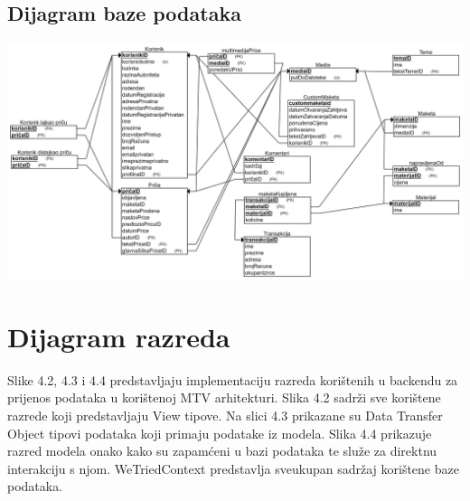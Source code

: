 			
			
			
			\subsection{Dijagram baze podataka}
			\vspace{\baselineskip}
			\vspace{\baselineskip}
			\vspace{\baselineskip}
			\vspace{\baselineskip}
			\vspace{\baselineskip}
			\vspace{\baselineskip}
			\vspace{\baselineskip}
			\vspace{\baselineskip}
			\vspace{\baselineskip}
			\vspace{\baselineskip}
				\includegraphics[width=1\linewidth]{slike/bazaRelShem}
			
			\eject
			
			
		\section{Dijagram razreda}
		
		Slike 4.2, 4.3 i 4.4 predstavljaju implementaciju razreda korištenih u backendu za prijenos podataka u korištenoj MTV arhitekturi. Slika 4.2 sadrži sve korištene razrede koji predstavljaju View tipove. Na slici 4.3 prikazane su Data Transfer Object tipovi podataka koji primaju podatake iz modela.  Slika 4.4 prikazuje razred modela onako kako su zapamćeni u bazi podataka te služe za direktnu interakciju s njom. WeTriedContext predstavlja sveukupan sadržaj korištene baze podataka.


